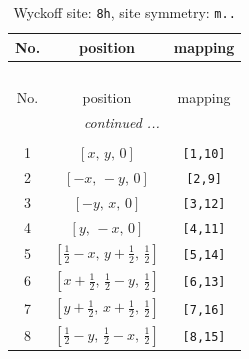\documentclass[fleqn,8pt]{jsarticle}
\begin{document}
\begin{longtable}{ccc}
\caption{Wyckoff site: {\tt 8h}, site symmetry: {\tt m..}}
 \\
 \hline \hline
No. & position & mapping \\ \hline \endfirsthead

\multicolumn{2}{l}{\tablename\ \thetable{}} \\
 \hline \hline
No. & position & mapping \\ \hline \endhead

 \hline \hline
\multicolumn{2}{r}{\footnotesize\it continued ...} \\ \endfoot

 \hline \hline
\multicolumn{2}{r}{} \\ \endlastfoot

1 & $\left[ x,\, y,\, 0 \right]$ & {\tt [1,10]} \\ \hline
2 & $\left[ - x,\, - y,\, 0 \right]$ & {\tt [2,9]} \\ \hline
3 & $\left[ - y,\, x,\, 0 \right]$ & {\tt [3,12]} \\ \hline
4 & $\left[ y,\, - x,\, 0 \right]$ & {\tt [4,11]} \\ \hline
5 & $\left[ \frac{1}{2} - x,\, y + \frac{1}{2},\, \frac{1}{2} \right]$ & {\tt [5,14]} \\ \hline
6 & $\left[ x + \frac{1}{2},\, \frac{1}{2} - y,\, \frac{1}{2} \right]$ & {\tt [6,13]} \\ \hline
7 & $\left[ y + \frac{1}{2},\, x + \frac{1}{2},\, \frac{1}{2} \right]$ & {\tt [7,16]} \\ \hline
8 & $\left[ \frac{1}{2} - y,\, \frac{1}{2} - x,\, \frac{1}{2} \right]$ & {\tt [8,15]} \\
\end{longtable}
\renewcommand{\arraystretch}{1.2}
\end{document}
